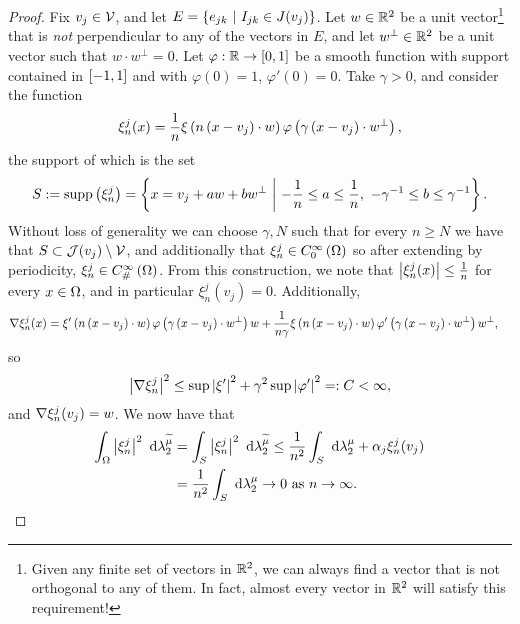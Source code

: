 \begin{proof}
	Fix $v_j\in\mathcal{V}$, and let $E = \left\{ e_{jk} \ \middle\vert \  I_{jk}\in J(v_j)  \right\}$.
	Let $w\in\mathbb{R}^2$ be a unit vector\footnote{Given any finite set of vectors in $\mathbb{R}^2$, we can always find a vector that is not orthogonal to any of them. In fact, almost every vector in $\mathbb{R}^2$ will satisfy this requirement!} that is \emph{not} perpendicular to any of the vectors in $E$, and let $w^{\perp}\in\mathbb{R}^2$ be a unit vector such that $w\cdot w^{\perp}=0$. 
	Let $\varphi:\mathbb{R}\rightarrow\left[ 0,1 \right]$ be a smooth function with support contained in $\left[ -1,1 \right]$ and with $\varphi(0)=1$, $\varphi'(0)=0$.
	Take $\gamma>0$, and consider the function
	\begin{align*}
		\xi_n^j(x) = \frac{1}{n}\xi\left( n\left( x-v_j \right)\cdot w \right)\varphi\left( \gamma\left( x-v_j \right)\cdot w^{\perp} \right),
	\end{align*}
	the support of which is the set
	\begin{align*}
		S := \mathrm{supp}\left( \xi_n^j \right) =
		\left\{  x=v_j+aw+bw^{\perp} \ \middle\vert \  -\frac{1}{n}\leq a\leq\frac{1}{n}, \ -\gamma^{-1}\leq b\leq\gamma^{-1}  \right\}.
	\end{align*}
	Without loss of generality we can choose $\gamma, N$ such that for every $n\geq N$ we have that $S\subset\mathcal{J}(v_j)\setminus\mathcal{V}$, and additionally that $\xi_n^j\in C^{\infty}_{0}\left( \Omega \right)$ so after extending by periodicity, $\xi_n^j\in C^{\infty}_{\#}\left( \Omega \right)$.
	From this construction, we note that $\left\lvert \xi_n^j(x) \right\rvert\leq\frac{1}{n}$ for every $x\in\Omega$, and in particular $\xi_n^j(v_j)=0$.
	Additionally,
	\begin{align*}
		\nabla\xi_n^j(x) &= \xi'\left( n\left( x-v_j \right)\cdot w \right)\varphi\left( \gamma\left( x-v_j \right)\cdot w^{\perp} \right)w + \frac{1}{n\gamma}\xi\left( n\left( x-v_j \right)\cdot w \right)\varphi'\left( \gamma\left( x-v_j \right)\cdot w^{\perp} \right)w^{\perp},
	\end{align*}
	so
	\begin{align*}
		\left\lvert \nabla\xi_n^j \right\rvert^2 \leq \sup\left\lvert \xi' \right\rvert^2 + \gamma^2\sup\left\lvert \varphi' \right\rvert^2 =: C < \infty,
	\end{align*}
	and $\nabla\xi_n^j(v_j)=w$.
	We now have that
	\begin{align*}
		\integral{\ddom}{\abs{\xi_n^j}^2}{\ccompMes}
		&= \integral{S}{\abs{\xi_n^j}^2}{\ccompMes}
		\leq \recip{n^2}\integral{S}{}{\compMes} + \alpha_j\xi_n^j(v_j) \\
		&= \recip{n^2}\integral{S}{}{\compMes} \rightarrow 0 \toInfty{n}.

\end{align*}
\end{proof}
